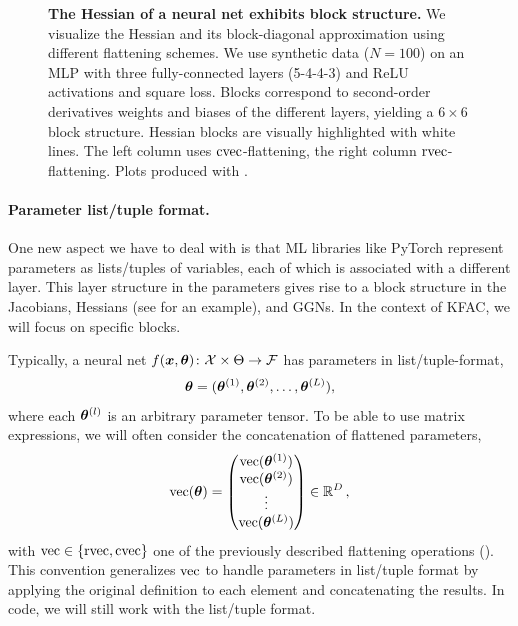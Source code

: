 \begin{figure}[!h]
\begin{minipage}[t]{0.495\linewidth}
  \end{minipage}
  \caption{\textbf{The Hessian of a neural net exhibits block structure.}
    We visualize the Hessian and its block-diagonal approximation using different flattening schemes.
    We use synthetic data ($N=100$) on an MLP with three fully-connected layers (5-4-4-3) and ReLU activations and square loss.
    Blocks correspond to second-order derivatives \wrt weights and biases of the different layers, yielding a $6 \times 6$ block structure.
    Hessian blocks are visually highlighted with white lines.
    The left column uses $\cvec$-flattening, the right column $\rvec$-flattening.
    Plots produced with .
  }\label{fig:hessian-block-structure}
\end{figure}
\switchcolumn[0]

\paragraph{Parameter list/tuple format.} One new aspect we have to deal with is that ML libraries like PyTorch represent parameters as lists/tuples of variables, each of which is associated with a different layer.
This layer structure in the parameters gives rise to a block structure in the Jacobians, Hessians (see  for an example), and GGNs.
In the context of KFAC, we will focus on specific blocks.

Typically, a neural net $f(\vx, \vtheta)\colon \gX \times \Theta \to \gF$ has parameters in list/tuple-format,
\begin{align*}
  \vtheta = (\vtheta^{(1)}, \vtheta^{(2)}, \ldots, \vtheta^{(L)}),
\end{align*}
where each $\vtheta^{(l)}$ is an arbitrary parameter tensor.
To be able to use matrix expressions, we will often consider the concatenation of flattened parameters,
\begin{align*}
  \vec(\vtheta)
  =
  \begin{pmatrix}
    \vec(\vtheta^{(1)}) \\
    \vec(\vtheta^{(2)}) \\
    \vdots              \\
    \vec(\vtheta^{(L)})
  \end{pmatrix}
  \in \sR^D
  \,,
\end{align*}
with $\vec \in \{ \rvec, \cvec \}$ one of the previously described flattening operations ().
This convention generalizes $\vec$ to handle parameters in list/tuple format by applying the original definition to each element and concatenating the results.
In code, we will still work with the list/tuple format.


